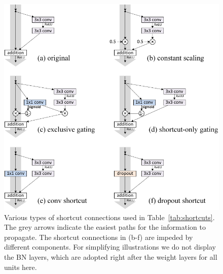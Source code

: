 \documentclass[runningheads]{llncs}
\begin{document}
\begin{figure}[t]
\centering
\includegraphics[width=.7\linewidth]{eps/shortcuts}
\caption{Various types of shortcut connections used in Table~\ref{tab:shortcuts}. The grey arrows indicate the easiest paths for the information to propagate. The shortcut connections in (b-f) are impeded by different components. For simplifying illustrations we do not display the BN layers, which are adopted right after the weight layers for all units here.}
\label{fig:shortcuts}
\end{figure}
\end{document}
